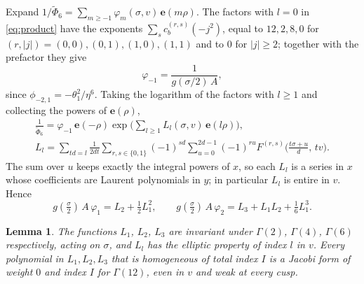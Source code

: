 \documentclass[11pt]{amsart}
\newtheorem{lemma}[theorem]{Lemma}
\theoremstyle{definition}
\newcommand{\Phit}{\widetilde\Phi}
\newcommand{\pA}{\phi_{-2,1}}
\newcommand{\e}{\mathbf e}
\begin{document}
Expand $1/\Phit_6=\sum_{m\ge-1}\varphi_m(\sigma,v)\,\e(m\rho)$. The factors with $l=0$ in \eqref{eq:product} have the exponents $\sum_s c_b^{(r,s)}(-j^2)$, equal to $12,2,8,0$ for $(r,|j|)=(0,0),(0,1),(1,0),(1,1)$ and to $0$ for $|j|\ge2$; together with the prefactor they give
\begin{equation}\label{eq:phim1}
\varphi_{-1}=\frac{1}{g(\sigma/2)\,A},
\end{equation}
since $\pA=-\theta_1^2/\eta^6$. Taking the logarithm of the factors with $l\ge1$ and collecting the powers of $\e(\rho)$,
\begin{equation}\label{eq:Ll}
\begin{gathered}
\frac{1}{\Phit_6}=\varphi_{-1}\,\e(-\rho)\exp\Big(\sum_{l\ge1}L_l(\sigma,v)\,\e(l\rho)\Big),\\
L_l=\sum_{td=l}\frac1{2dt}\sum_{r,s\in\{0,1\}}(-1)^{sd}\sum_{u=0}^{2d-1}(-1)^{ru}F^{(r,s)}\Big(\frac{t\sigma+u}d,\,tv\Big).
\end{gathered}
\end{equation}
The sum over $u$ keeps exactly the integral powers of $x$, so each $L_l$ is a series in $x$ whose coefficients are Laurent polynomials in $y$; in particular $L_l$ is entire in $v$. Hence
\begin{equation}\label{eq:phi12}
g(\tfrac\sigma2)\,A\,\varphi_1=L_2+\tfrac12L_1^2,\qquad g(\tfrac\sigma2)\,A\,\varphi_2=L_3+L_1L_2+\tfrac16L_1^3 .
\end{equation}

\begin{lemma}\label{lem:modular}
The functions $L_1$, $L_2$, $L_3$ are invariant under $\Gamma(2)$, $\Gamma(4)$, $\Gamma(6)$ respectively, acting on $\sigma$, and $L_l$ has the elliptic property of index $l$ in $v$. Every polynomial in $L_1,L_2,L_3$ that is homogeneous of total index $I$ is a Jacobi form of weight $0$ and index $I$ for $\Gamma(12)$, even in $v$ and weak at every cusp.
\end{lemma}
\end{document}

